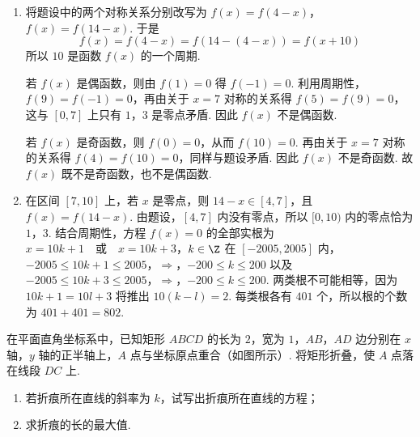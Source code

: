 \begin{solution}
\begin{enumerate}
\item
将题设中的两个对称关系分别改写为
\(f(x)=f(4-x)\)，\(f(x)=f(14-x)\).
于是
\[
f(x)=f(4-x)=f(14-(4-x))=f(x+10)
\]
所以 \(10\) 是函数 \(f(x)\) 的一个周期.

若 \(f(x)\) 是偶函数，则由 \(f(1)=0\) 得 \(f(-1)=0\). 利用周期性，\(f(9)=f(-1)=0\)，再由关于 \(x=7\) 对称的关系得 \(f(5)=f(9)=0\)，这与 \([0,7]\) 上只有 \(1\)，\(3\) 是零点矛盾. 因此 \(f(x)\) 不是偶函数.

若 \(f(x)\) 是奇函数，则 \(f(0)=0\)，从而 \(f(10)=0\). 再由关于 \(x=7\) 对称的关系得 \(f(4)=f(10)=0\)，同样与题设矛盾. 因此 \(f(x)\) 不是奇函数. 故 \(f(x)\) 既不是奇函数，也不是偶函数.

\item
在区间 \([7,10]\) 上，若 \(x\) 是零点，则 \(14-x\in[4,7]\)，且 \(f(x)=f(14-x)\). 由题设，\([4,7]\) 内没有零点，所以 \([0,10)\) 内的零点恰为 \(1\)，\(3\). 结合周期性，方程 \(f(x)=0\) 的全部实根为
\(x=10k+1\quad\text{或}\quad x=10k+3\)，\(k\in\Z\)
在 \([-2005,2005]\) 内，
\(-2005\leqslant10k+1\leqslant2005\)，\(\Longrightarrow\)，\(-200\leqslant k\leqslant200\)
以及
\(-2005\leqslant10k+3\leqslant2005\)，\(\Longrightarrow\)，\(-200\leqslant k\leqslant200\).
两类根不可能相等，因为 \(10k+1=10l+3\) 将推出 \(10(k-l)=2\). 每类根各有 \(401\) 个，所以根的个数为 \(401+401=802\).
\end{enumerate}
\end{solution}

\begin{problem}
在平面直角坐标系中，已知矩形 \(ABCD\) 的长为 \(2\)，宽为 \(1\)，\(AB\)，\(AD\) 边分别在 \(x\) 轴，\(y\) 轴的正半轴上，\(A\) 点与坐标原点重合（如图所示）. 将矩形折叠，使 \(A\) 点落在线段 \(DC\) 上.

\begin{enumerate}
\item 若折痕所在直线的斜率为 \(k\)，试写出折痕所在直线的方程；
\item 求折痕的长的最大值.
\end{enumerate}

\end{problem}


